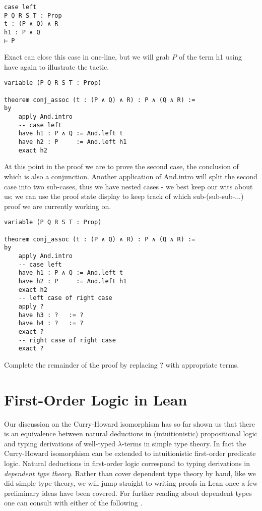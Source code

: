 \documentclass{book}
\begin{document}
\begin{eg}
\begin{center}
\begin{lstlisting}
case left
P Q R S T : Prop
t : (P ∧ Q) ∧ R
h1 : P ∧ Q
⊢ P
            \end{lstlisting}            
        \end{center}
        Exact can close this case in one-line, but we will grab $P$ of the term h1 using have again to illustrate the tactic.
        \begin{center}
            \begin{lstlisting}
variable (P Q R S T : Prop)

theorem conj_assoc (t : (P ∧ Q) ∧ R) : P ∧ (Q ∧ R) :=
by
    apply And.intro
    -- case left
    have h1 : P ∧ Q := And.left t
    have h2 : P     := And.left h1
    exact h2
            \end{lstlisting}            
        \end{center}

        At this point in the proof we are to prove the second case, the conclusion of which is also a conjunction. Another application of And.intro will split the second case into two sub-cases, thus we have nested cases - we best keep our wits about us; we can use the proof state display to keep track of which sub-(sub-sub-...) proof we are currently working on. 

        \begin{center}
            \begin{lstlisting}
variable (P Q R S T : Prop)

theorem conj_assoc (t : (P ∧ Q) ∧ R) : P ∧ (Q ∧ R) :=
by
    apply And.intro
    -- case left
    have h1 : P ∧ Q := And.left t
    have h2 : P     := And.left h1
    exact h2
    -- left case of right case
    apply ?
    have h3 : ?   := ?
    have h4 : ?   := ?
    exact ?
    -- right case of right case
    exact ?
            \end{lstlisting}            
        \end{center}
        Complete the remainder of the proof by replacing ? with appropriate terms.  
    \end{eg}

    \newpage
    \section{First-Order Logic in Lean}

    Our discussion on the Curry-Howard isomorphism has so far shown us that there is an equivalence between natural deductions in (intuitionistic) propositional logic and typing derivations of well-typed $\lambda$-terms in simple type theory. In fact the Curry-Howard isomorphism can be extended to intuitionistic first-order predicate logic. Natural deductions in first-order logic correspond to typing derivations in \emph{dependent type theory}. Rather than cover dependent type theory by hand, like we did simple type theory, we will jump straight to writing proofs in Lean once a few preliminary ideas have been covered. For further reading about dependent types one can consult with either of the following \cite{thompson} \cite{HoTT}.
\end{document}
